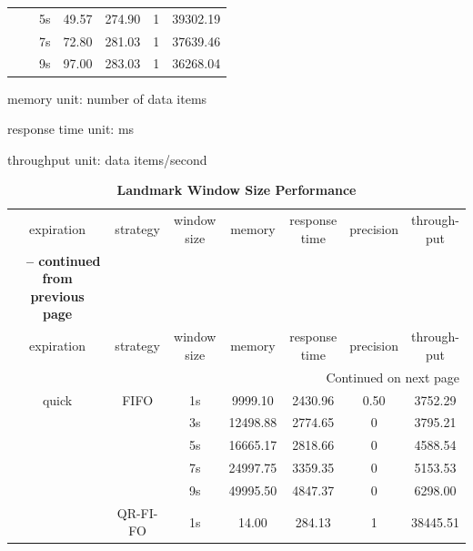 \begin{center}
\begin{longtable}{|c||c||c|c|c|c|c|}
			   &          & 5s & 49.57 & 274.90 & 1 & 39302.19\\ \cline{3-7}
			   &          & 7s & 72.80 & 281.03 & 1 & 37639.46\\ \cline{3-7}
			   &          & 9s & 97.00 & 283.03 & 1 & 36268.04 \\              
\end{longtable}
    \begin{tablenotes}
 		\item memory unit: number of data items
 		\item response time unit: ms
 		\item throughput unit: data items/second
    \end{tablenotes}
\end{center}

\begin{center}
	\begin{longtable}{|c||c||c|c|c|c|c|}
	\caption{\textbf{Landmark Window Size Performance}} \label{tab:6-lwsp} \\
	\hline expiration & strategy & \makecell{window \\ size} & memory & \makecell{response \\ time} & precision & \makecell{through-\\put} \\ \hhline{|=#=#=|=|=|=|=|}
	\endfirsthead
	\multicolumn{7}{c} {{\bfseries \tablename\ \thetable{} -- continued from previous page}} \\
	\hline expiration & strategy & \makecell{window \\ size} & memory & \makecell{response \\ time} & precision & \makecell{through-\\put} \\ \hline 
	\endhead
	\hline \multicolumn{7}{|r|}{{Continued on next page}} \\ \hline
	\endfoot
	\hline
	\endlastfoot    
        quick & FIFO & 1s & 9999.10 & 2430.96 & 0.50 & 3752.29 \\ \cline{3-7}
			  &	     & 3s & 12498.88 & 2774.65 & 0 & 3795.21 \\ \cline{3-7}
			  &      & 5s & 16665.17 & 2818.66 & 0 & 4588.54 \\ \cline{3-7}
			  &      & 7s & 24997.75 & 3359.35 & 0 & 5153.53 \\ \cline{3-7}
			  &      & 9s & 49995.50 & 4847.37 & 0 & 6298.00 \\ \cline{2-7}
			  & QR-FI-FO & 1s & 14.00 & 284.13 & 1& 38445.51\\ \cline{3-7}

\end{longtable}
\end{center}
